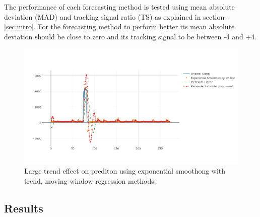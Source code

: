\documentclass[conference,onecolumn]{IEEEtran}
\begin{document}
The performance of each forecasting method is tested using mean absolute deviation (MAD) and tracking signal ratio (TS) as explained in section-\ref{sec:intro}. For the forecasting method to perform better its mean absolute deviation should be close to zero and its tracking signal to be between -4 and +4.


\begin{figure}[ht]
\includegraphics[scale=0.4]{comp}
\centering
\caption{Large trend effect on prediton using exponential smoothong with trend, moving window regression methods.}
\label{fig:comp}
\end{figure}

\subsection{Results}
\label{subsec:results}
\end{document}
